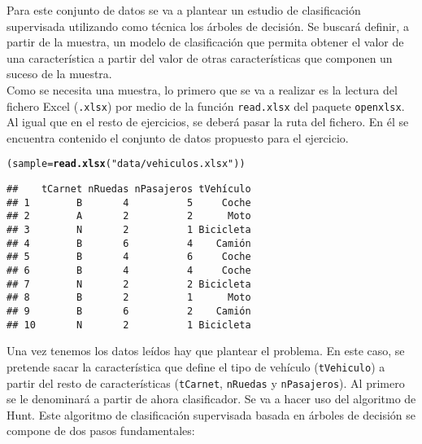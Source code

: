 \documentclass[12pt]{report}\usepackage[]{graphicx}\usepackage[dvipsnames]{xcolor}
\makeatletter
\newcommand{\hlstr}[1]{\textcolor[rgb]{0.192,0.494,0.8}{#1}}%
\newcommand{\hlstd}[1]{\textcolor[rgb]{0.345,0.345,0.345}{#1}}%
\newcommand{\hlkwb}[1]{\textcolor[rgb]{0.69,0.353,0.396}{#1}}%
\newcommand{\hlkwd}[1]{\textcolor[rgb]{0.737,0.353,0.396}{\textbf{#1}}}%
\newenvironment{kframe}{%
 \def\at@end@of@kframe{}%
 \ifinner\ifhmode%
  \def\at@end@of@kframe{\end{minipage}}%
  \begin{minipage}{\columnwidth}%
 \fi\fi%
 \def\FrameCommand##1{\hskip\@totalleftmargin \hskip-\fboxsep
 \colorbox{shadecolor}{##1}\hskip-\fboxsep
     \hskip-\linewidth \hskip-\@totalleftmargin \hskip\columnwidth}%
 \MakeFramed {\advance\hsize-\width
   \@totalleftmargin\z@ \linewidth\hsize
   \@setminipage}}%
 {\par\unskip\endMakeFramed%
 \at@end@of@kframe}
\newenvironment{knitrout}{}{} %
\makeatother
\begin{document}
	 			Para este conjunto de datos se va a plantear un estudio de clasificación supervisada utilizando como técnica los árboles de decisión. Se buscará definir, a partir de la muestra, un modelo de clasificación que permita obtener el valor de una característica a partir del valor de otras características que componen un suceso de la muestra. \\
	 			
	 			Como se necesita una muestra, lo primero que se va a realizar es la lectura del fichero Excel (\texttt{.xlsx}) por medio de la función \texttt{read.xlsx} del paquete \texttt{openxlsx}. Al igual que en el resto de ejercicios, se deberá pasar la ruta del fichero. En él se encuentra contenido el conjunto de datos propuesto para el ejercicio.
	 			
\begin{knitrout}
\color{fgcolor}\begin{kframe}
\begin{alltt}
\hlstd{(sample} \hlkwb{=} \hlkwd{read.xlsx}\hlstd{(}\hlstr{"data/vehiculos.xlsx"}\hlstd{))}
\end{alltt}
\begin{verbatim}
##    tCarnet nRuedas nPasajeros tVehículo
## 1        B       4          5     Coche
## 2        A       2          2      Moto
## 3        N       2          1 Bicicleta
## 4        B       6          4    Camión
## 5        B       4          6     Coche
## 6        B       4          4     Coche
## 7        N       2          2 Bicicleta
## 8        B       2          1      Moto
## 9        B       6          2    Camión
## 10       N       2          1 Bicicleta
\end{verbatim}
\end{kframe}
\end{knitrout}
	 			
	 			Una vez tenemos los datos leídos hay que plantear el problema. En este caso, se pretende sacar la característica que define el tipo de vehículo (\texttt{tVehiculo}) a partir del resto de características (\texttt{tCarnet}, \texttt{nRuedas} y \texttt{nPasajeros}). Al primero se le denominará a partir de ahora clasificador. Se va a hacer uso del algoritmo de Hunt. Este algoritmo de clasificación supervisada basada en árboles de decisión se compone de dos pasos fundamentales:
	 			
\end{document}
